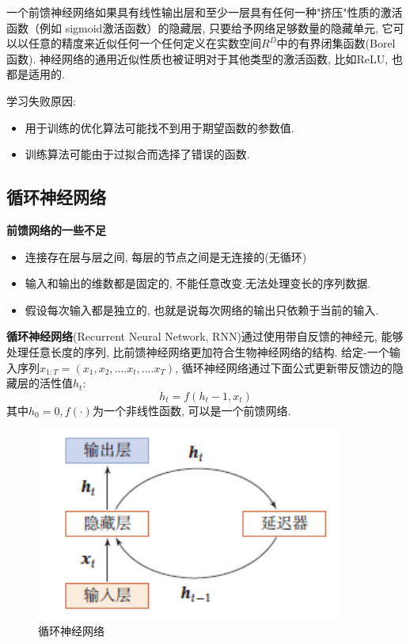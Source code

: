\documentclass[a4paper]{article}
\begin{document}
一个前馈神经网络如果具有线性输出层和至少一层具有任何一种"挤压"性质的激活函数（例如 sigmoid激活函数）的隐藏层, 只要给予网络足够数量的隐藏单元, 它可以以任意的精度来近似任何一个任何定义在实数空间$ R^D$中的有界闭集函数(Borel 函数). 神经网络的通用近似性质也被证明对于其他类型的激活函数, 比如ReLU, 也都是适用的.

学习失败原因:
\begin{itemize}
    \item 用于训练的优化算法可能找不到用于期望函数的参数值.
    \item 训练算法可能由于过拟合而选择了错误的函数.
\end{itemize}
\subsection{循环神经网络}

\textbf{前馈网络的一些不足}
\begin{itemize}
    \item 连接存在层与层之间, 每层的节点之间是无连接的(无循环)
    \item 输入和输出的维数都是固定的, 不能任意改变.无法处理变长的序列数据.
    \item 假设每次输入都是独立的, 也就是说每次网络的输出只依赖于当前的输入.
\end{itemize}

\textbf{循环神经网络}(Recurrent Neural Network, RNN)通过使用带自反馈的神经元, 能够处理任意长度的序列, 比前馈神经网络更加符合生物神经网络的结构.
给定-一个输入序列$x_{1:T} =(x_1, x_2,  .... x_t, .... x_T)$, 循环神经网络通过下面公式更新带反馈边的隐藏层的活性值$h_t$:
$$h_t= f(h_t-1, x_t)$$
其中$h_0= 0, f( \cdot )$为一个非线性函数, 可以是一个前馈网络.
\begin{figure}[!htb]
    \center
\includegraphics[width=0.9\textwidth]{RNN_sample.png}
\caption{循环神经网络}
\end{figure}
\end{document}
